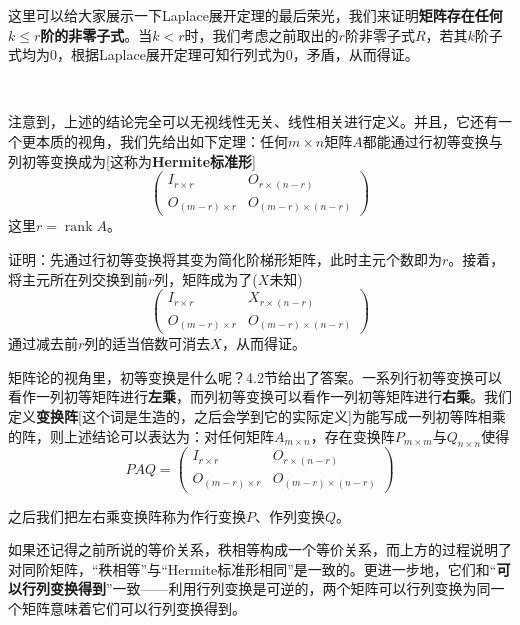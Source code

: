 \documentclass[a4paper,UTF8,fontset=windows]{ctexart}
\DeclareMathOperator{\rank}{rank}
\newcommand*{\note}{\noindent *}
\begin{document}
\note 这里可以给大家展示一下Laplace展开定理的最后荣光，我们来证明\textbf{矩阵存在任何$k\le r$阶的非零子式}。当$k<r$时，我们考虑之前取出的$r$阶非零子式$R$，若其$k$阶子式均为0，根据Laplace展开定理可知行列式为0，矛盾，从而得证。

\

注意到，上述的结论完全可以无视线性无关、线性相关进行定义。并且，它还有一个更本质的视角，我们先给出如下定理：任何$m\times n$矩阵$A$都能通过行初等变换与列初等变换成为[这称为\textbf{Hermite标准形}]
$$\begin{pmatrix}I_{r\times r}&O_{r\times(n-r)}\\O_{(m-r)\times r}&O_{(m-r)\times(n-r)}\end{pmatrix}$$
这里$r=\rank A$。

证明：先通过行初等变换将其变为简化阶梯形矩阵，此时主元个数即为$r$。接着，将主元所在列交换到前$r$列，矩阵成为了($X$未知)
$$\begin{pmatrix}I_{r\times r}&X_{r\times(n-r)}\\O_{(m-r)\times r}&O_{(m-r)\times(n-r)}\end{pmatrix}$$
通过减去前$r$列的适当倍数可消去$X$，从而得证。

矩阵论的视角里，初等变换是什么呢？4.2节给出了答案。一系列行初等变换可以看作一列初等矩阵进行\textbf{左乘}，而列初等变换可以看作一列初等矩阵进行\textbf{右乘}。我们定义\textbf{变换阵}[这个词是生造的，之后会学到它的实际定义]为能写成一列初等阵相乘的阵，则上述结论可以表达为：对任何矩阵$A_{m\times n}$，存在变换阵$P_{m\times m}$与$Q_{n\times n}$使得
$$PAQ=\begin{pmatrix}I_{r\times r}&O_{r\times(n-r)}\\O_{(m-r)\times r}&O_{(m-r)\times(n-r)}\end{pmatrix}$$

\note 之后我们把左右乘变换阵称为作行变换$P$、作列变换$Q$。

\note 如果还记得之前所说的等价关系，秩相等构成一个等价关系，而上方的过程说明了对同阶矩阵，``秩相等''与``Hermite标准形相同''是一致的。更进一步地，它们和``\textbf{可以行列变换得到}''一致——利用行列变换是可逆的，两个矩阵可以行列变换为同一个矩阵意味着它们可以行列变换得到。

\
\end{document}
